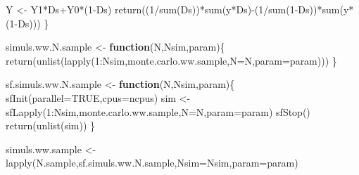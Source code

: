 \documentclass[
]{book}
\newenvironment{Shaded}{\begin{snugshade}}{\end{snugshade}}
\newcommand{\AttributeTok}[1]{\textcolor[rgb]{0.77,0.63,0.00}{#1}}
\newcommand{\ConstantTok}[1]{\textcolor[rgb]{0.00,0.00,0.00}{#1}}
\newcommand{\ControlFlowTok}[1]{\textcolor[rgb]{0.13,0.29,0.53}{\textbf{#1}}}
\newcommand{\DecValTok}[1]{\textcolor[rgb]{0.00,0.00,0.81}{#1}}
\newcommand{\FunctionTok}[1]{\textcolor[rgb]{0.00,0.00,0.00}{#1}}
\newcommand{\NormalTok}[1]{#1}
\newcommand{\OtherTok}[1]{\textcolor[rgb]{0.56,0.35,0.01}{#1}}
\newcommand{\SpecialCharTok}[1]{\textcolor[rgb]{0.00,0.00,0.00}{#1}}
\theoremstyle{definition}
\theoremstyle{definition}
\theoremstyle{definition}
\theoremstyle{definition}
\theoremstyle{remark}
\begin{document}
\begin{Shaded}
\begin{Highlighting}[]
\NormalTok{  Y }\OtherTok{\textless{}{-}}\NormalTok{ Y1}\SpecialCharTok{*}\NormalTok{Ds}\SpecialCharTok{+}\NormalTok{Y0}\SpecialCharTok{*}\NormalTok{(}\DecValTok{1}\SpecialCharTok{{-}}\NormalTok{Ds)}
  \FunctionTok{return}\NormalTok{((}\DecValTok{1}\SpecialCharTok{/}\FunctionTok{sum}\NormalTok{(Ds))}\SpecialCharTok{*}\FunctionTok{sum}\NormalTok{(y}\SpecialCharTok{*}\NormalTok{Ds)}\SpecialCharTok{{-}}\NormalTok{(}\DecValTok{1}\SpecialCharTok{/}\FunctionTok{sum}\NormalTok{(}\DecValTok{1}\SpecialCharTok{{-}}\NormalTok{Ds))}\SpecialCharTok{*}\FunctionTok{sum}\NormalTok{(y}\SpecialCharTok{*}\NormalTok{(}\DecValTok{1}\SpecialCharTok{{-}}\NormalTok{Ds)))}
\NormalTok{\}}

\NormalTok{simuls.ww.N.sample }\OtherTok{\textless{}{-}} \ControlFlowTok{function}\NormalTok{(N,Nsim,param)\{}
  \FunctionTok{return}\NormalTok{(}\FunctionTok{unlist}\NormalTok{(}\FunctionTok{lapply}\NormalTok{(}\DecValTok{1}\SpecialCharTok{:}\NormalTok{Nsim,monte.carlo.ww.sample,}\AttributeTok{N=}\NormalTok{N,}\AttributeTok{param=}\NormalTok{param)))}
\NormalTok{\}}

\NormalTok{sf.simuls.ww.N.sample }\OtherTok{\textless{}{-}} \ControlFlowTok{function}\NormalTok{(N,Nsim,param)\{}
  \FunctionTok{sfInit}\NormalTok{(}\AttributeTok{parallel=}\ConstantTok{TRUE}\NormalTok{,}\AttributeTok{cpus=}\NormalTok{ncpus)}
\NormalTok{  sim }\OtherTok{\textless{}{-}} \FunctionTok{sfLapply}\NormalTok{(}\DecValTok{1}\SpecialCharTok{:}\NormalTok{Nsim,monte.carlo.ww.sample,}\AttributeTok{N=}\NormalTok{N,}\AttributeTok{param=}\NormalTok{param)}
  \FunctionTok{sfStop}\NormalTok{()}
  \FunctionTok{return}\NormalTok{(}\FunctionTok{unlist}\NormalTok{(sim))}
\NormalTok{\}}

\NormalTok{simuls.ww.sample }\OtherTok{\textless{}{-}} \FunctionTok{lapply}\NormalTok{(N.sample,sf.simuls.ww.N.sample,}\AttributeTok{Nsim=}\NormalTok{Nsim,}\AttributeTok{param=}\NormalTok{param)}


\end{Highlighting}
\end{Shaded}
\end{document}
